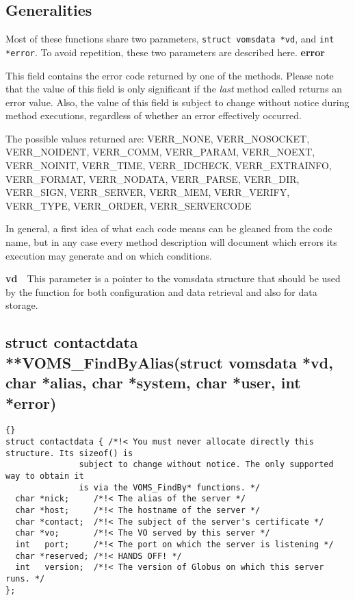 \documentclass[a4paper]{book}
\newcommand{\parameter}[1]{\newline\textbf{#1}\ \ }
\begin{document}
\subsection{Generalities}
Most of these functions share two parameters,
\verb|struct vomsdata *vd|, and \verb|int *error|.  To avoid
repetition, these two parameters are described here.
\parameter{error}{This field contains the error code returned by one of the methods.
Please note that the value of this field is only significant if the
\emph{last} method called returns an error value.  Also, the value of
this field is subject to change without notice during method
executions, regardless of whether an error effectively occurred.

The possible values returned are:
VERR\_NONE, VERR\_NOSOCKET, VERR\_NOIDENT, VERR\_COMM, VERR\_PARAM, 
VERR\_NOEXT, VERR\_NOINIT, VERR\_TIME, VERR\_IDCHECK, VERR\_EXTRAINFO,
VERR\_FORMAT, VERR\_NODATA, VERR\_PARSE, VERR\_DIR, VERR\_SIGN, 
VERR\_SERVER, VERR\_MEM, VERR\_VERIFY, VERR\_TYPE, VERR\_ORDER, 
VERR\_SERVERCODE

In general, a first idea of what each code means can be gleaned from
the code name, but in any case every method description will document
which errors its execution may generate and on which conditions.}
\parameter{vd}{This parameter is a pointer to the vomsdata structure
  that should be used by the function for both configuration and data
  retrieval and also for data storage.}



\subsection{struct contactdata **VOMS\_FindByAlias(struct vomsdata *vd, char *alias, char *system, char *user, int *error)}

\begin{lstlisting}{}
struct contactdata { /*!< You must never allocate directly this structure. Its sizeof() is
		       subject to change without notice. The only supported way to obtain it
		       is via the VOMS_FindBy* functions. */
  char *nick;     /*!< The alias of the server */
  char *host;     /*!< The hostname of the server */
  char *contact;  /*!< The subject of the server's certificate */
  char *vo;       /*!< The VO served by this server */
  int   port;     /*!< The port on which the server is listening */                            
  char *reserved; /*!< HANDS OFF! */
  int   version;  /*!< The version of Globus on which this server runs. */
};
\end{lstlisting}
\end{document}

